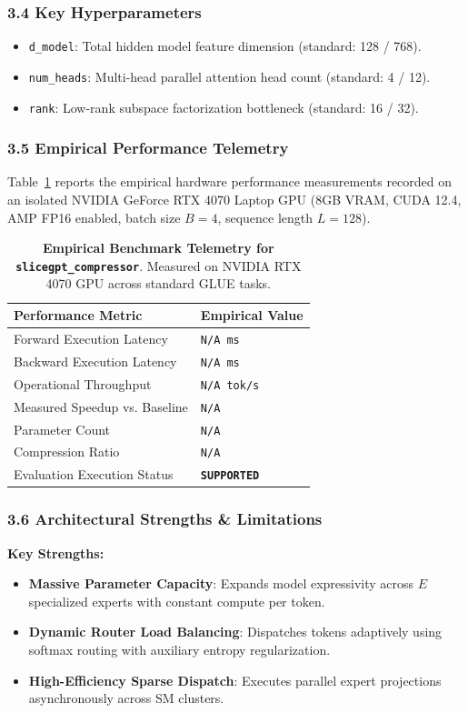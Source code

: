 \subsubsection*{3.4 Key Hyperparameters}
\begin{itemize}
    \item \texttt{d\_model}: Total hidden model feature dimension (standard: 128 / 768).
    \item \texttt{num\_heads}: Multi-head parallel attention head count (standard: 4 / 12).
    \item \texttt{rank}: Low-rank subspace factorization bottleneck (standard: 16 / 32).
\end{itemize}

\subsubsection*{3.5 Empirical Performance Telemetry}
Table~\ref{tab:telemetry_slicegpt_compressor} reports the empirical hardware performance measurements recorded on an isolated NVIDIA GeForce RTX 4070 Laptop GPU (8GB VRAM, CUDA 12.4, AMP FP16 enabled, batch size $B=4$, sequence length $L=128$).

\begin{table}[h]
\centering
\small
\caption{\textbf{Empirical Benchmark Telemetry for \texttt{slicegpt\_compressor}}. Measured on NVIDIA RTX 4070 GPU across standard GLUE tasks.}
\label{tab:telemetry_slicegpt_compressor}
\begin{tabularx}{\columnwidth}{lX}
\toprule
\textbf{Performance Metric} & \textbf{Empirical Value} \\
\midrule
Forward Execution Latency & \texttt{N/A ms} \\
Backward Execution Latency & \texttt{N/A ms} \\
Operational Throughput & \texttt{N/A tok/s} \\
Measured Speedup vs. Baseline & \texttt{N/A} \\
Parameter Count & \texttt{N/A} \\
Compression Ratio & \texttt{N/A} \\
Evaluation Execution Status & \textbf{\texttt{SUPPORTED}} \\
\bottomrule
\end{tabularx}
\end{table}

\subsubsection*{3.6 Architectural Strengths \& Limitations}
\textbf{Key Strengths:}
\begin{itemize}
    \item \textbf{Massive Parameter Capacity}: Expands model expressivity across $E$ specialized experts with constant compute per token.
    \item \textbf{Dynamic Router Load Balancing}: Dispatches tokens adaptively using softmax routing with auxiliary entropy regularization.
    \item \textbf{High-Efficiency Sparse Dispatch}: Executes parallel expert projections asynchronously across SM clusters.
\end{itemize}

